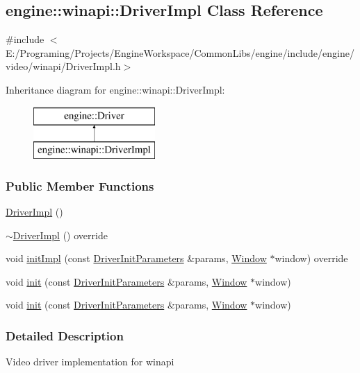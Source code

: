 \hypertarget{a00027}{}\subsection{engine\+:\+:winapi\+:\+:Driver\+Impl Class Reference}
\label{a00027}


{\ttfamily \#include $<$E\+:/\+Programing/\+Projects/\+Engine\+Workspace/\+Common\+Libs/engine/include/engine/video/winapi/\+Driver\+Impl.\+h$>$}

Inheritance diagram for engine\+:\+:winapi\+:\+:Driver\+Impl\+:\begin{figure}[H]
\begin{center}
\leavevmode
\includegraphics[height=2.000000cm]{a00027}
\end{center}
\end{figure}
\subsubsection*{Public Member Functions}
\begin{DoxyCompactItemize}
\item 
\hyperlink{a00027_a5819d40195dd4ecc23de16090c20f746}{Driver\+Impl} ()
\item 
\hyperlink{a00027_a700cf49e15416ea10fc567459535f9f1}{$\sim$\+Driver\+Impl} () override
\item 
void \hyperlink{a00027_a1a6bbae98bc32e3c78c0a47092bda76a}{init\+Impl} (const \hyperlink{a00028}{Driver\+Init\+Parameters} \&params, \hyperlink{a00082}{Window} $\ast$window) override
\item 
void \hyperlink{a00024_a4e283b1274b6ffea595cb7329b09c16d}{init} (const \hyperlink{a00028}{Driver\+Init\+Parameters} \&params, \hyperlink{a00082}{Window} $\ast$window)
\item 
void \hyperlink{a00024_a4e283b1274b6ffea595cb7329b09c16d}{init} (const \hyperlink{a00028}{Driver\+Init\+Parameters} \&params, \hyperlink{a00082}{Window} $\ast$window)
\end{DoxyCompactItemize}


\subsubsection{Detailed Description}
Video driver implementation for winapi 


